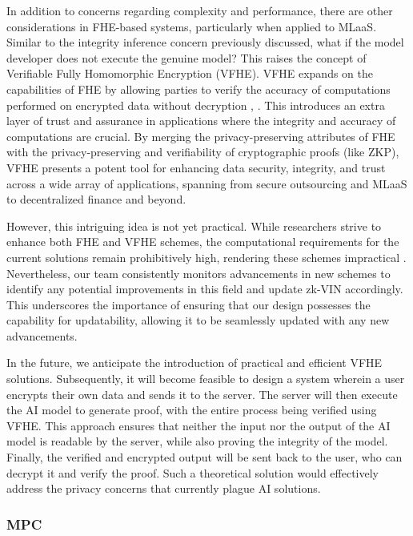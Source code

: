 \documentclass[conference]{IEEEtran}
\begin{document}

In addition to concerns regarding complexity and performance, there are other considerations in FHE-based systems, particularly when applied to MLaaS. Similar to the integrity inference concern previously discussed, what if the model developer does not execute the genuine model? This raises the concept of Verifiable Fully Homomorphic Encryption (VFHE). VFHE expands on the capabilities of FHE by allowing parties to verify the accuracy of computations performed on encrypted data without decryption \cite{Viand2023VerifiableFH}, \cite{Chatel2022VerifiableEF}. This introduces an extra layer of trust and assurance in applications where the integrity and accuracy of computations are crucial. By merging the privacy-preserving attributes of FHE with the privacy-preserving and verifiability of cryptographic proofs (like ZKP), VFHE presents a potent tool for enhancing data security, integrity, and trust across a wide array of applications, spanning from secure outsourcing and MLaaS to decentralized finance and beyond.

However, this intriguing idea is not yet practical. While researchers strive to enhance both FHE and VFHE schemes, the computational requirements for the current solutions remain prohibitively high, rendering these schemes impractical \cite{Atapoor2024VerifiableFV}. Nevertheless, our team consistently monitors advancements in new schemes to identify any potential improvements in this field and update zk-VIN accordingly. This underscores the importance of ensuring that our design possesses the capability for updatability, allowing it to be seamlessly updated with any new advancements.

In the future, we anticipate the introduction of practical and efficient VFHE solutions. Subsequently, it will become feasible to design a system wherein a user encrypts their own data and sends it to the server. The server will then execute the AI model to generate proof, with the entire process being verified using VFHE. This approach ensures that neither the input nor the output of the AI model is readable by the server, while also proving the integrity of the model. Finally, the verified and encrypted output will be sent back to the user, who can decrypt it and verify the proof. Such a theoretical solution would effectively address the privacy concerns that currently plague AI solutions.


\subsubsection{MPC}
\end{document}

